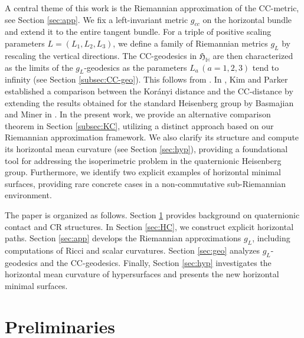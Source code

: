 \documentclass [12pt,a4paper]{amsart}
\newcommand{\frakH}{\mathfrak{H}}
\theoremstyle{plain}
\theoremstyle{definition}
\numberwithin{equation}{section}
\begin{document}
A central theme of this work is the Riemannian approximation of the CC-metric, see Section \ref{sec:app}. We fix a left-invariant metric $g_{cc}$ on the horizontal bundle and extend it to the entire tangent bundle. For a triple of positive scaling parameters $L=(L_1, L_2, L_3)$, we define a family of Riemannian metrics $g_L$ by rescaling the vertical directions. The CC-geodesics in $\mathfrak{H}_{\mathbb{H}}$ are then characterized as the limits of the $g_L$-geodesics as the parameters $L_a\, (a=1, 2, 3)$ tend to infinity (see Section \ref{subsec:CC-geo}). This follows from \cite{CDPT}.
In \cite{KP}, Kim and Parker established a comparison between the Korányi distance and the CC-distance by extending the results obtained for the standard Heisenberg group by Basmajian and Miner in \cite{BM}. In the present work, we provide an alternative comparison theorem in Section \ref{subsec:KC}, utilizing a distinct approach based on our Riemannian approximation framework.
We also clarify its structure and compute its horizontal mean curvature (see Section \ref{sec:hyp}), providing a foundational tool for addressing the isoperimetric problem in the quaternionic Heisenberg group. Furthermore, we identify two explicit examples of horizontal minimal surfaces, providing rare concrete cases in a non-commutative sub-Riemannian environment.

The paper is organized as follows. Section \ref{sec:pre} provides background on quaternionic contact and CR structures. In Section \ref{sec:HC}, we construct explicit horizontal paths. Section \ref{sec:app} develops the Riemannian approximations $g_L$, including computations of Ricci and scalar curvatures. Section \ref{sec:geo} analyzes $g_L$-geodesics and the CC-geodesics. Finally, Section \ref{sec:hyp} investigates the horizontal mean curvature of hypersurfaces and presents the new horizontal minimal surfaces.



\section{Preliminaries}\label{sec:pre}
\end{document}
